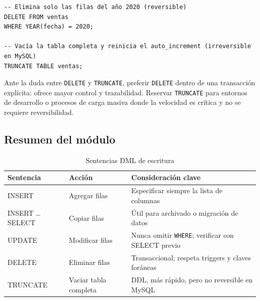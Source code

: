 \begin{lstlisting}[style=sql, caption={Diferencia práctica entre DELETE y TRUNCATE}]
-- Elimina solo las filas del año 2020 (reversible)
DELETE FROM ventas
WHERE YEAR(fecha) = 2020;

-- Vacía la tabla completa y reinicia el auto_increment (irreversible en MySQL)
TRUNCATE TABLE ventas;
\end{lstlisting}

\begin{nota}
  Ante la duda entre \texttt{DELETE} y \texttt{TRUNCATE}, preferir
  \texttt{DELETE} dentro de una transacción explícita: ofrece mayor control y
  trazabilidad. Reservar \texttt{TRUNCATE} para entornos de desarrollo o
  procesos de carga masiva donde la velocidad es crítica y no se requiere
  reversibilidad.
\end{nota}

\subsection*{Resumen del módulo}

\begin{table}[H]
  \centering
  \caption{Sentencias DML de escritura}
  \renewcommand{\arraystretch}{1.3}
  \begin{tabularx}{\textwidth}{>{\ttfamily}l l X}
    \toprule
    \textbf{Sentencia}  & \textbf{Acción}          & \textbf{Consideración clave}                          \\
    \midrule
    INSERT              & Agregar filas            & Especificar siempre la lista de columnas              \\
    INSERT \ldots SELECT & Copiar filas            & Útil para archivado o migración de datos              \\
    UPDATE              & Modificar filas          & Nunca omitir \texttt{WHERE}; verificar con SELECT previo \\
    DELETE              & Eliminar filas           & Transaccional; respeta triggers y claves foráneas     \\
    TRUNCATE            & Vaciar tabla completa    & DDL, más rápido, pero no reversible en MySQL          \\
    \bottomrule
  \end{tabularx}
\end{table}



